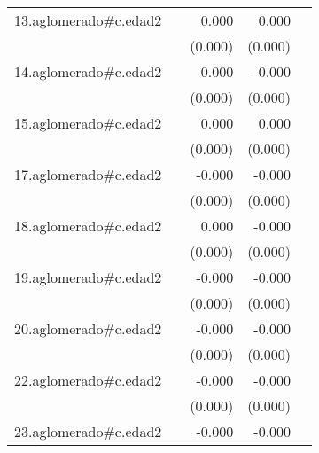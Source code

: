 {\begin{longtable}{l*{4}{D{.}{.}{-1}}}
\addlinespace
13.aglomerado#c.edad2&                     &       0.000\sym{**} &       0.000         &                     \\
            &                     &     (0.000)         &     (0.000)         &                     \\
\addlinespace
14.aglomerado#c.edad2&                     &       0.000         &      -0.000         &                     \\
            &                     &     (0.000)         &     (0.000)         &                     \\
\addlinespace
15.aglomerado#c.edad2&                     &       0.000         &       0.000         &                     \\
            &                     &     (0.000)         &     (0.000)         &                     \\
\addlinespace
17.aglomerado#c.edad2&                     &      -0.000         &      -0.000\sym{***}&                     \\
            &                     &     (0.000)         &     (0.000)         &                     \\
\addlinespace
18.aglomerado#c.edad2&                     &       0.000         &      -0.000         &                     \\
            &                     &     (0.000)         &     (0.000)         &                     \\
\addlinespace
19.aglomerado#c.edad2&                     &      -0.000         &      -0.000\sym{**} &                     \\
            &                     &     (0.000)         &     (0.000)         &                     \\
\addlinespace
20.aglomerado#c.edad2&                     &      -0.000         &      -0.000\sym{*}  &                     \\
            &                     &     (0.000)         &     (0.000)         &                     \\
\addlinespace
22.aglomerado#c.edad2&                     &      -0.000         &      -0.000\sym{***}&                     \\
            &                     &     (0.000)         &     (0.000)         &                     \\
\addlinespace
23.aglomerado#c.edad2&                     &      -0.000         &      -0.000\sym{**} &                     \\

\end{longtable}}
